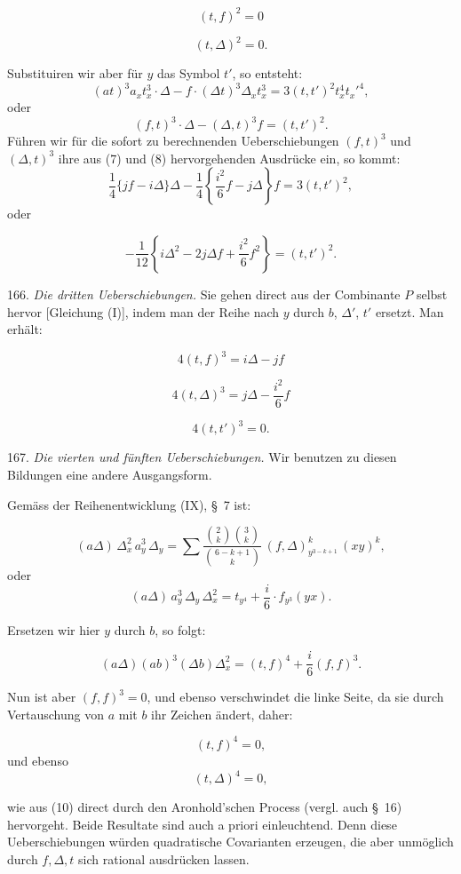 \documentclass[11pt]{article}
\providecommand{\weberpage}[1]{}
\providecommand{\weq}[2]{\begin{equation}\tag{#1}#2\end{equation}}
\let\Delta\varDelta
\begin{document}
\weq{4}{(t,f)^2 = 0}

\weq{5}{(t,\Delta)^2 = 0.}

Substituiren wir aber für $y$ das Symbol $t'$, so entsteht:
\[
(at)^3 a_x t_x^3 \cdot \Delta - f\cdot(\Delta t)^3 \Delta_x t_x^3 = 3(t,t')^2 t_x^4 t_x'^4,
\]
oder
\[
(f,t)^3 \cdot \Delta - (\Delta,t)^3 f = (t,t')^2.
\]
Führen wir für die sofort zu berechnenden Ueberschiebungen $(f,t)^3$ und $(\Delta,t)^3$ ihre aus (7) und (8) hervorgehenden Ausdrücke ein, so kommt:
\[
\frac{1}{4}\{jf - i\Delta\}\Delta - \frac{1}{4}\left\{\frac{i^2}{6} f - j\Delta\right\}f = 3(t,t')^2,
\]
oder

\weq{6}{-\frac{1}{12}\left\{i\Delta^2 - 2j\Delta f + \frac{i^2}{6} f^2\right\} = (t,t')^2.}

166. \textit{Die dritten Ueberschiebungen.} Sie gehen direct aus der Combinante $P$ selbst hervor [Gleichung (I)], indem man der Reihe nach $y$ durch $b$, $\Delta'$, $t'$ ersetzt. Man erhält:

\weq{7}{4(t,f)^3 = i\Delta - jf}

\weq{8}{4(t,\Delta)^3 = j\Delta - \frac{i^2}{6} f}

\weq{9}{4(t,t')^3 = 0.}


\weberpage{185}

167. \textit{Die vierten und fünften Ueberschiebungen.} Wir benutzen zu diesen Bildungen eine andere Ausgangsform.

Gemäss der Reihenentwicklung (IX), \S~7 ist:

\[
(a\Delta)\,\Delta_x^2\,a_y^3\,\Delta_y = \sum \frac{\binom{2}{k}\binom{3}{k}}{\binom{6-k+1}{k}}\,(f,\Delta)^k_{y^{3-k+1}}\,(xy)^k,
\]
oder
\[
(a\Delta)\,a_y^3\,\Delta_y\,\Delta_x^2 = t_{y^4} + \frac{i}{6}\cdot f_{y^3}(yx).
\]

Ersetzen wir hier $y$ durch $b$, so folgt:

\[
(a\Delta)(ab)^3(\Delta b)\Delta_x^2 = (t,f)^4 + \frac{i}{6}(f,f)^3.
\]

Nun ist aber $(f,f)^3=0$, und ebenso verschwindet die linke Seite, da sie durch Vertauschung von $a$ mit $b$ ihr Zeichen ändert, daher:

\weq{10}{(t,f)^4 = 0,}
und ebenso
\weq{11}{(t,\Delta)^4 = 0,}

wie aus (10) direct durch den Aronhold'schen Process (vergl. auch \S~16) hervorgeht. Beide Resultate sind auch a priori einleuchtend. Denn diese Ueberschiebungen würden quadratische Covarianten erzeugen, die aber unmöglich durch $f, \Delta, t$ sich rational ausdrücken lassen.
\end{document}
